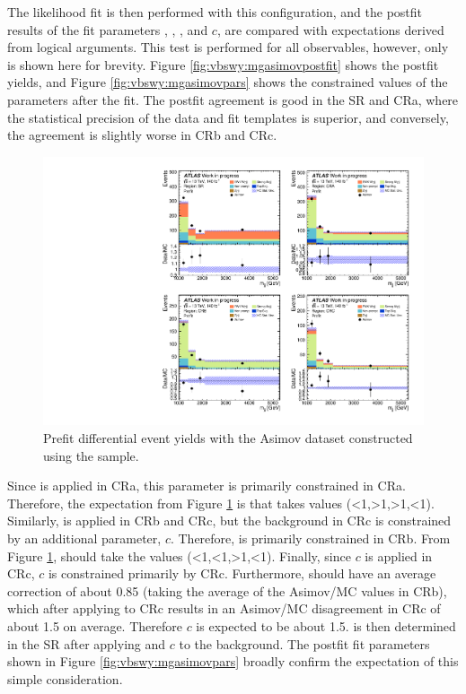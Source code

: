 The likelihood fit is then performed with this configuration, and the postfit results of the fit parameters \muew, \bl, \bh, and $c$, are compared with expectations derived from logical arguments. This test is performed for all observables, however, only \mjj is shown here for brevity. Figure \ref{fig:vbswy:mgasimovpostfit} shows the postfit yields, and Figure \ref{fig:vbswy:mgasimovpars} shows the constrained values of the parameters after the fit. The postfit agreement is good in the SR and CRa, where the statistical precision of the data and fit templates is superior, and conversely, the agreement is slightly worse in CRb and CRc.

\begin{figure}[t]
  \centering
  \includegraphics[width=\textwidth]{plots/diffx/mgasimovtest/mjj_prefit_data_30Nov.pdf}
  \caption{Prefit differential event yields with the Asimov dataset constructed using the \MADGRAPH \qcdwy sample.\label{fig:vbswy:mgasimovprefit}}
\end{figure}

Since \bl is applied in CRa, this parameter is primarily constrained in CRa. Therefore, the expectation from Figure \ref{fig:vbswy:mgasimovprefit} is that \bl takes values (<1,>1,>1,<1). Similarly, \bh is applied in CRb and CRc, but the \qcdwy background in CRc is constrained by an additional parameter, $c$. Therefore, \bh is primarily constrained in CRb. From Figure \ref{fig:vbswy:mgasimovprefit}, \bh should take the values (<1,<1,>1,<1). Finally, since $c$ is applied in CRc, $c$ is constrained primarily by CRc. Furthermore, \bh should have an average correction of about 0.85 (taking the average of the Asimov/MC values in CRb), which after applying to CRc results in an Asimov/MC disagreement in CRc of about 1.5 on average. Therefore $c$ is expected to be about 1.5. \muew is then determined in the SR after applying \bl and $c$ to the \qcdwy background. The postfit fit parameters shown in Figure \ref{fig:vbswy:mgasimovpars} broadly confirm the expectation of this simple consideration.

